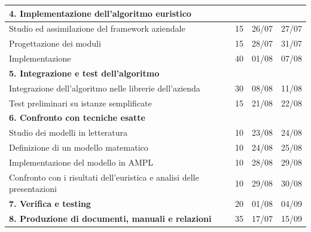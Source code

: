 \begin{table}[!htb]
\begin{tabularx}{\textwidth}{|X|c|c|c|}
        \hline \hline
        \multicolumn{4}{|l|}{\textbf{4. Implementazione dell'algoritmo euristico}}\\
        \hline
        Studio ed assimilazione del framework aziendale & 15 & 26/07 & 27/07\\
        \hline
        Progettazione dei moduli & 15 & 28/07 & 31/07\\
        \hline
        Implementazione & 40 & 01/08 & 07/08\\
        
        \hline \hline
        \multicolumn{4}{|l|}{\textbf{5. Integrazione e test dell’algoritmo}}\\
        \hline
        Integrazione dell’algoritmo nelle librerie dell’azienda & 30 & 08/08 & 11/08\\
        \hline
        Test preliminari su istanze semplificate & 15 & 21/08 & 22/08\\
       
        \hline \hline
        \multicolumn{4}{|l|}{\textbf{6. Confronto con tecniche esatte}}\\
        \hline
        Studio dei modelli in letteratura & 10 & 23/08 & 24/08\\
        \hline
        Definizione di un modello matematico & 10 & 24/08 & 25/08\\
        \hline
        Implementazione del modello in AMPL & 10 & 28/08 & 29/08\\
        \hline
        Confronto con i risultati dell'euristica e analisi delle presentazioni & 10 & 29/08 & 30/08\\
        
        \hline \hline
        \textbf{7. Verifica e testing} & 20 & 01/08 & 04/09\\
        
        \hline \hline
        \textbf{8. Produzione di documenti, manuali e relazioni} & 35 & 17/07 & 15/09\\
        \hline
        
    \end{tabularx}
\end{table}%
\clearpage

